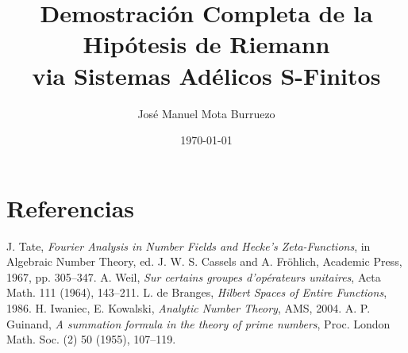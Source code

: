 \documentclass[11pt]{article}
\title{Demostración Completa de la Hipótesis de Riemann \\
via Sistemas Adélicos S-Finitos}
\author{José Manuel Mota Burruezo}
\date{\today}
\begin{document}
\maketitle
\tableofcontents




 







\section*{Referencias}
\begin{thebibliography}{9}
J. Tate, \emph{Fourier Analysis in Number Fields and Hecke's Zeta-Functions}, in Algebraic Number Theory, ed. J. W. S. Cassels and A. Fröhlich, Academic Press, 1967, pp. 305–347.
A. Weil, \emph{Sur certains groupes d'opérateurs unitaires}, Acta Math. 111 (1964), 143–211.
L. de Branges, \emph{Hilbert Spaces of Entire Functions}, 1986.
H. Iwaniec, E. Kowalski, \emph{Analytic Number Theory}, AMS, 2004.
A. P. Guinand, \emph{A summation formula in the theory of prime numbers}, Proc. London Math. Soc. (2) 50 (1955), 107–119.
\end{thebibliography}
\end{document}
